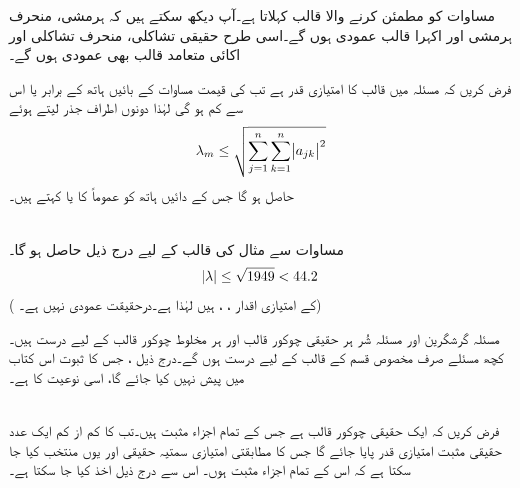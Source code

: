 مساوات  کو مطمئن کرنے والا قالب  کہلاتا ہے۔آپ دیکھ سکتے ہیں کہ ہرمشی، منحرف ہرمشی اور اکہرا قالب عمودی ہوں گے۔اسی طرح حقیقی تشاکلی، منحرف تشاکلی اور اکائی متعامد قالب بھی عمودی ہوں گے۔

فرض کریں کہ مسئلہ  میں قالب  کا امتیازی قدر  ہے تب  کی قیمت  مساوات  کے بائیں ہاتھ کے برابر یا اس سے کم ہو گی لہٰذا دونوں اطراف جذر لیتے ہوئے
\begin{align}\label{مساوات_خطی_اعدادی_عدم_شر_پ}
\lambda_m\le \sqrt{ \sum_{j=1}^{n}\sum_{k=1}^{n}\abs{a_{jk}}^2}
\end{align}
حاصل ہو گا جس کے دائیں ہاتھ کو عموماً   کا  یا  کہتے ہیں۔ 

\quad {}\\
مساوات  سے مثال  کی قالب  کے لیے درج ذیل حاصل ہو گا۔
\begin{align*}
\abs{\lambda}\le \sqrt{1949}<44.2
\end{align*}
( کے امتیازی اقدار ، ،  ہیں لہٰذا  ہے۔درحقیقت  عمودی نہیں ہے۔)

مسئلہ گرشگرین اور مسئلہ شُر ہر حقیقی چوکور قالب اور ہر مخلوط چوکور قالب کے لیے درست ہیں۔کچھ مسئلے صرف مخصوص قسم کے قالب کے لیے درست ہوں گے۔درج ذیل ،  جس کا ثبوت اس کتاب میں پیش نہیں کیا جائے گا، اسی نوعیت کا ہے۔ 

\quad {}\\
فرض کریں کہ  ایک حقیقی چوکور قالب ہے جس کے تمام اجزاء مثبت ہیں۔تب  کا کم از کم ایک عدد حقیقی مثبت امتیازی قدر پایا جائے گا جس کا مطابقتی امتیازی سمتیہ حقیقی اور یوں منتخب کیا جا سکتا ہے کہ اس کے تمام اجزاء مثبت ہوں۔
اس سے درج ذیل   اخذ کیا جا سکتا ہے۔

